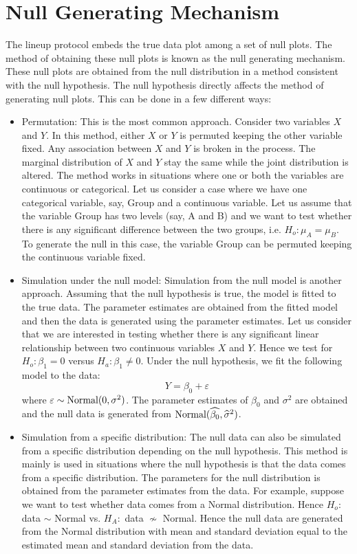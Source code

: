 \documentclass[12]{article}
\begin{document}
\section{Null Generating Mechanism} \label{sec:null}

The lineup protocol embeds the true data plot among a set of null plots. The method of obtaining these null plots is known as the null generating mechanism. These null plots are obtained from the null distribution in a method consistent with the null hypothesis. The null hypothesis directly affects the method of generating null plots. This can be done in a few different ways:
\begin{itemize}
\item Permutation: This is the most common approach. Consider two variables $X$ and $Y$. In this method,  either $X$ or $Y$ is permuted keeping the other variable fixed. Any association between $X$ and $Y$ is broken in the process. The marginal distribution of $X$ and $Y$ stay the same while the joint distribution is altered. The method works in situations where one or both the variables are continuous or categorical. Let us consider a case where we have one categorical variable, say, Group and a continuous variable. Let us assume that the variable Group has two levels (say, A and B) and we want to test whether there is any significant difference between the two groups, i.e. $H_o: \mu_A = \mu_B$. To generate the null in this case,  the variable Group can be permuted keeping the continuous variable fixed. 
\item Simulation under the null model: Simulation from the null model is another approach. Assuming that the null hypothesis is true, the model is fitted to the true data. The parameter estimates are obtained from the fitted model and then the data is generated using the parameter estimates. Let us consider that we are interested in testing whether there is any significant linear relationship between two continuous variables $X$ and $Y$. Hence we test for $H_o : \beta_1 = 0$ versus $H_a: \beta_1 \ne 0$. Under the null hypothesis, we fit the following model to the data:
$$Y = \beta_0 + \varepsilon$$
where $\varepsilon \sim \hbox{Normal}(0, \sigma^2)$. The parameter estimates of $\beta_0$ and $\sigma^2$ are obtained and the null data is generated from $\hbox{Normal}(\widehat{\beta_0}, \widehat{\sigma}^2)$. 
\item Simulation from a specific distribution: The null data can also be simulated from a specific distribution depending on the null hypothesis. This method is mainly is used in situations where the null hypothesis is that the data comes from a specific distribution. The parameters for the null distribution is obtained from the parameter estimates from the data. For example, suppose we want to test whether data comes from a Normal distribution. Hence $H_o:$ data $\sim$ Normal vs. $H_A:$ data $\nsim$ Normal. Hence the null data are generated from the Normal distribution with mean and standard deviation equal to the estimated mean and standard deviation from the data. 
\end{itemize} 
\end{document}

